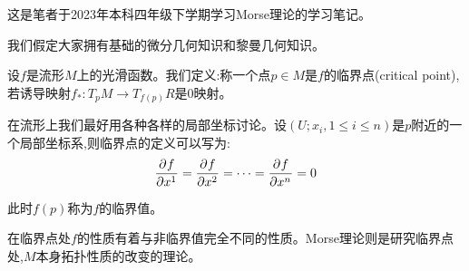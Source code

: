 \documentclass{package/fancy-book}
\begin{document}

\tableofcontents

\quad
\newpage
这是笔者于2023年本科四年级下学期学习Morse理论的学习笔记。

我们假定大家拥有基础的微分几何知识和黎曼几何知识。

设$f$是流形$M$上的光滑函数。我们定义:称一个点$p\in M$是$f$的临界点(critical point),若诱导映射$f_*:T_pM \to T_{f(p)}R$是$0$映射。

在流形上我们最好用各种各样的局部坐标讨论。设$(U;x_i,1\leq i \leq n)$是$p$附近的一个局部坐标系,则临界点的定义可以写为:
\begin{align}
	\frac{\partial^{} f}{\partial {x^1}^{}}=\frac{\partial^{} f}{\partial {x^2}^{}}=\dots=\frac{\partial^{} f}{\partial {x^n}^{}}=0
\end{align}

此时$f(p)$称为$f$的临界值。

在临界点处$f$的性质有着与非临界值完全不同的性质。Morse理论则是研究临界点处,$M$本身拓扑性质的改变的理论。



\end{document}
